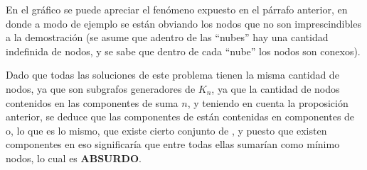 \documentclass[11pt, a4paper, twoside]{article}
\begin{document}
\begin{paragraph}
\begin{demostracion}
En el gráfico se puede apreciar el fenómeno expuesto en el párrafo anterior,
en donde a modo de ejemplo se están obviando los nodos que no son
imprescindibles a la demostración (se asume que adentro de las ``nubes'' hay
una cantidad indefinida de nodos, y se sabe que dentro de cada ``nube'' los
nodos son conexos).

\end{demostracion}

Dado que todas las soluciones de este problema tienen la misma cantidad de
nodos, ya que son subgrafos generadores de $K_n$, ya que la cantidad de nodos
contenidos en las  componentes de  suma $n$,
y teniendo en cuenta la proposición anterior, se deduce que las
 componentes de  están contenidas en
 componentes de  o, lo que es lo
mismo, que existe cierto conjunto de , y puesto que existen
 componentes en  eso significaría que entre
todas ellas sumarían como mínimo  nodos, lo cual es
\textbf{ABSURDO}.

\end{paragraph}
\end{document}
